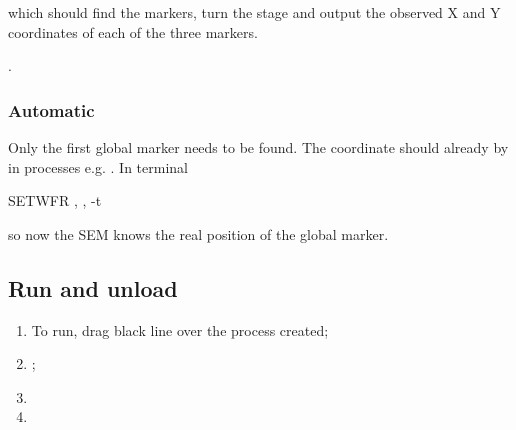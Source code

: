    \noindent which should find the markers, turn the stage and output the observed X and Y coordinates of each of the three markers.
   
   .
   
   \subsubsection{Automatic} Only the first global marker needs to be found. The coordinate should already by in processes e.g. . In terminal
   
   \begin{center}
   	SETWFR , , -t 
   \end{center}  

   \noindent so now the SEM knows the real position of the global marker. 
   
   \subsection{Run and unload}
   \begin{enumerate}
   	\item To run, drag black line over the process created;
   	\item {};
   	\item {}
   	\item {}   \end{enumerate}
   
   
 \newpage
 
